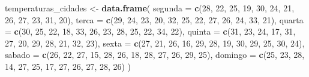 \documentclass[
]{book}
\newenvironment{Shaded}{\begin{snugshade}}{\end{snugshade}}
\newcommand{\AttributeTok}[1]{\textcolor[rgb]{0.13,0.29,0.53}{#1}}
\newcommand{\DecValTok}[1]{\textcolor[rgb]{0.00,0.00,0.81}{#1}}
\newcommand{\FunctionTok}[1]{\textcolor[rgb]{0.13,0.29,0.53}{\textbf{#1}}}
\newcommand{\NormalTok}[1]{#1}
\newcommand{\OtherTok}[1]{\textcolor[rgb]{0.56,0.35,0.01}{#1}}
\begin{document}
\begin{Shaded}
\begin{Highlighting}[]
\NormalTok{temperaturas\_cidades }\OtherTok{\textless{}{-}} \FunctionTok{data.frame}\NormalTok{(}
  \AttributeTok{segunda  =} \FunctionTok{c}\NormalTok{(}\DecValTok{28}\NormalTok{, }\DecValTok{22}\NormalTok{, }\DecValTok{25}\NormalTok{, }\DecValTok{19}\NormalTok{, }\DecValTok{30}\NormalTok{, }\DecValTok{24}\NormalTok{, }\DecValTok{21}\NormalTok{, }\DecValTok{26}\NormalTok{, }\DecValTok{27}\NormalTok{, }\DecValTok{23}\NormalTok{, }\DecValTok{31}\NormalTok{, }\DecValTok{20}\NormalTok{),}
  \AttributeTok{terca    =} \FunctionTok{c}\NormalTok{(}\DecValTok{29}\NormalTok{, }\DecValTok{24}\NormalTok{, }\DecValTok{23}\NormalTok{, }\DecValTok{20}\NormalTok{, }\DecValTok{32}\NormalTok{, }\DecValTok{25}\NormalTok{, }\DecValTok{22}\NormalTok{, }\DecValTok{27}\NormalTok{, }\DecValTok{26}\NormalTok{, }\DecValTok{24}\NormalTok{, }\DecValTok{33}\NormalTok{, }\DecValTok{21}\NormalTok{),}
  \AttributeTok{quarta   =} \FunctionTok{c}\NormalTok{(}\DecValTok{30}\NormalTok{, }\DecValTok{25}\NormalTok{, }\DecValTok{22}\NormalTok{, }\DecValTok{18}\NormalTok{, }\DecValTok{33}\NormalTok{, }\DecValTok{26}\NormalTok{, }\DecValTok{23}\NormalTok{, }\DecValTok{28}\NormalTok{, }\DecValTok{25}\NormalTok{, }\DecValTok{22}\NormalTok{, }\DecValTok{34}\NormalTok{, }\DecValTok{22}\NormalTok{),}
  \AttributeTok{quinta   =} \FunctionTok{c}\NormalTok{(}\DecValTok{31}\NormalTok{, }\DecValTok{23}\NormalTok{, }\DecValTok{24}\NormalTok{, }\DecValTok{17}\NormalTok{, }\DecValTok{31}\NormalTok{, }\DecValTok{27}\NormalTok{, }\DecValTok{20}\NormalTok{, }\DecValTok{29}\NormalTok{, }\DecValTok{28}\NormalTok{, }\DecValTok{21}\NormalTok{, }\DecValTok{32}\NormalTok{, }\DecValTok{23}\NormalTok{),}
  \AttributeTok{sexta    =} \FunctionTok{c}\NormalTok{(}\DecValTok{27}\NormalTok{, }\DecValTok{21}\NormalTok{, }\DecValTok{26}\NormalTok{, }\DecValTok{16}\NormalTok{, }\DecValTok{29}\NormalTok{, }\DecValTok{28}\NormalTok{, }\DecValTok{19}\NormalTok{, }\DecValTok{30}\NormalTok{, }\DecValTok{29}\NormalTok{, }\DecValTok{25}\NormalTok{, }\DecValTok{30}\NormalTok{, }\DecValTok{24}\NormalTok{),}
  \AttributeTok{sabado   =} \FunctionTok{c}\NormalTok{(}\DecValTok{26}\NormalTok{, }\DecValTok{22}\NormalTok{, }\DecValTok{27}\NormalTok{, }\DecValTok{15}\NormalTok{, }\DecValTok{28}\NormalTok{, }\DecValTok{26}\NormalTok{, }\DecValTok{18}\NormalTok{, }\DecValTok{28}\NormalTok{, }\DecValTok{27}\NormalTok{, }\DecValTok{26}\NormalTok{, }\DecValTok{29}\NormalTok{, }\DecValTok{25}\NormalTok{),}
  \AttributeTok{domingo  =} \FunctionTok{c}\NormalTok{(}\DecValTok{25}\NormalTok{, }\DecValTok{23}\NormalTok{, }\DecValTok{28}\NormalTok{, }\DecValTok{14}\NormalTok{, }\DecValTok{27}\NormalTok{, }\DecValTok{25}\NormalTok{, }\DecValTok{17}\NormalTok{, }\DecValTok{27}\NormalTok{, }\DecValTok{26}\NormalTok{, }\DecValTok{27}\NormalTok{, }\DecValTok{28}\NormalTok{, }\DecValTok{26}\NormalTok{)}
\NormalTok{)}
\end{Highlighting}
\end{Shaded}
\end{document}
